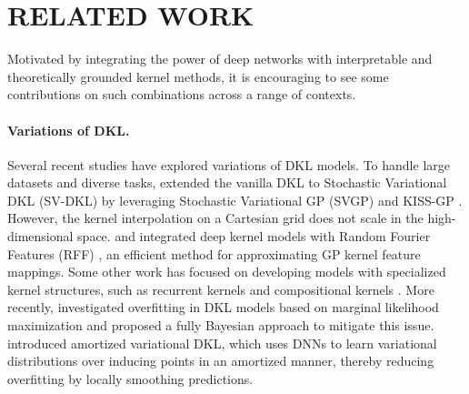 \section{RELATED WORK}
\label{sec:related work}
Motivated by integrating the power of deep networks with interpretable and theoretically grounded kernel methods, it is encouraging to see some contributions on such combinations across a range of contexts.

\paragraph{Variations of DKL.} 
Several recent studies have explored variations of DKL models. To handle large datasets and diverse tasks, \citet{wilson2016stochastic} extended the vanilla DKL \citep{wilson2016deep} to Stochastic Variational DKL (SV-DKL) by leveraging Stochastic Variational GP (SVGP) \citep{hensman2015scalable} and KISS-GP \citep{wilson2015kernel}. However, the kernel interpolation on a Cartesian grid does not scale in the high-dimensional space. \citet{xue2019deep} and \citet{xie2019deep} integrated deep kernel models with Random Fourier Features (RFF) \citep{rahimi2007random}, an efficient method for approximating GP kernel feature mappings. Some other work has focused on developing models with specialized kernel structures, such as recurrent kernels \citep{al2017learning} and compositional kernels \citep{sun2018differentiable}. More recently, %
\citet{ober2021promises} investigated overfitting in DKL models based on marginal likelihood maximization and proposed a fully Bayesian approach to mitigate this issue. \citet{matias2024amortized} introduced amortized variational DKL, which uses DNNs to learn variational distributions over inducing points in an amortized manner, thereby reducing overfitting by locally smoothing predictions. 

